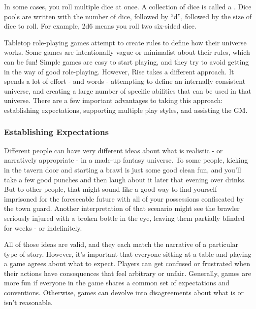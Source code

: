     In some cases, you roll multiple dice at once.
    A collection of dice is called a .
    Dice pools are written with the number of dice, followed by ``d'', followed by the size of dice to roll.
    For example, 2d6 means you roll two six-sided dice.


    Tabletop role-playing games attempt to create rules to define how their universe works.
    Some games are intentionally vague or minimalist about their rules, which can be fun!
    Simple games are easy to start playing, and they try to avoid getting in the way of good role-playing.
    However, Rise takes a different approach.
    It spends a lot of effort - and words - attempting to define an internally consistent universe, and creating a large number of specific abilities that can be used in that universe.
    There are a few important advantages to taking this approach: establishing expectations, supporting multiple play styles, and assisting the GM.

    \subsubsection{Establishing Expectations}
      Different people can have very different ideas about what is realistic - or narratively appropriate - in a made-up fantasy universe.
      To some people, kicking in the tavern door and starting a brawl is just some good clean fun, and you'll take a few good punches and then laugh about it later that evening over drinks.
      But to other people, that might sound like a good way to find yourself imprisoned for the foreseeable future with all of your possessions confiscated by the town guard.
      Another interpretation of that scenario might see the brawler seriously injured with a broken bottle in the eye, leaving them partially blinded for weeks - or indefinitely.

      All of those ideas are valid, and they each match the narrative of a particular type of story.
      However, it's important that everyone sitting at a table and playing a game agrees about what to expect.
      Players can get confused or frustrated when their actions have consequences that feel arbitrary or unfair.
      Generally, games are more fun if everyone in the game shares a common set of expectations and conventions.
      Otherwise, games can devolve into disagreements about what is or isn't reasonable.

